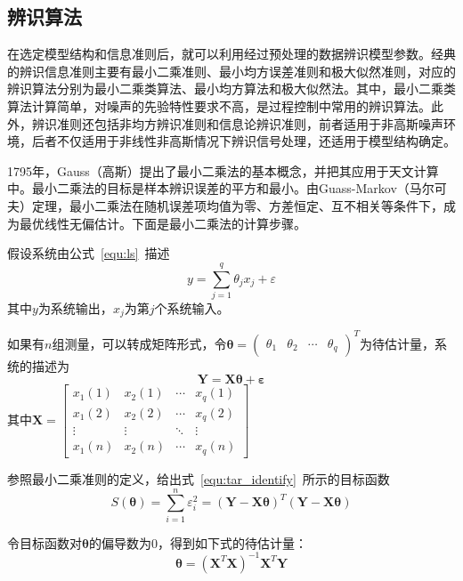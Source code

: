 \subsection{辨识算法}
在选定模型结构和信息准则后，就可以利用经过预处理的数据辨识模型参数。经典的辨识信息准则主要有最小二乘准则、最小均方误差准则和极大似然准则，对应的辨识算法分别为最小二乘类算法、最小均方算法和极大似然法。其中，最小二乘类算法计算简单，对噪声的先验特性要求不高，是过程控制中常用的辨识算法。此外，辨识准则还包括非均方辨识准则和信息论辨识准则，前者适用于非高斯噪声环境，后者不仅适用于非线性非高斯情况下辨识信号处理，还适用于模型结构确定\cite{陈霸东2011系统参数辨识的信息准则及算法}。

1795年，Gauss（高斯）提出了最小二乘法的基本概念，并把其应用于天文计算中。最小二乘法的目标是样本辨识误差的平方和最小。由Guass-Markov（马尔可夫）定理，最小二乘法在随机误差项均值为零、方差恒定、互不相关等条件下，成为最优线性无偏估计\cite{montgomery2015introduction}。下面是最小二乘法的计算步骤。

假设系统由公式~\ref{equ:ls}~描述
\begin{equation}
\label{equ:ls}
y = \sum_{j=1}^{q}{\theta_{j}}{x_{j}}+\varepsilon
\end{equation}
其中$y$为系统输出，$x_{j}$为第$j$个系统输入。

如果有$n$组测量，可以转成矩阵形式，令$\bm{\theta} = {\begin{pmatrix} \theta_{1} & \theta_{2} &\cdots & \theta_{q} \end{pmatrix}}^{T}$为待估计量，系统的描述为 
\begin{equation}
\bm{Y} = \bm{X}\bm{\theta} + \bm{\varepsilon}
\end{equation}
其中$\bm{X} = \left[{\begin{array}{cccc}
x_{1}{(1)}  & x_{2}{(1)}&\cdots&x_{q}{(1)}\\
x_{1}{(2)}  & x_{2}{(2)}&\cdots&x_{q}{(2)}\\
\vdots & \vdots &\ddots  &\vdots\\
x_{1}{(n)}  & x_{2}{(n)}&\cdots&x_{q}{(n)}
\end{array}}\right]$

参照最小二乘准则的定义，给出式~\ref{equ:tar_identify}~所示的目标函数
\begin{equation}
\label{equ:tar_identify}
{S}(\bm{\theta})=\sum_{i=1}^{n}{\varepsilon_{i}^{2}}=(\bm{Y}-\bm{X}\bm{\theta})^{T}(\bm{Y}-\bm{X}\bm{\theta})
\end{equation}

令目标函数对$\bm{\theta}$的偏导数为0，得到如下式的待估计量：
\begin{equation}
{\bm{\theta}}=(\bm{X}^{T}\bm{X})^{-1}\bm{X}^{T}\bm{Y}
\end{equation}

